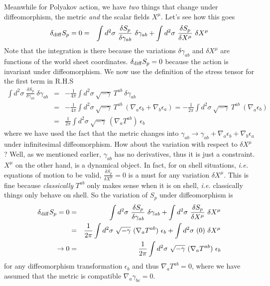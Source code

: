 \documentclass[aps,preprint,preprintnumbers,nofootinbib,showpacs,prd]{revtex4-1}
\newcommand{\ie}{{\it i.e.} }
\newcommand{\nbea}{\begin{eqnarray*}}
\newcommand{\neea}{\end{eqnarray*}}
\begin{document}
Meanwhile for Polyakov action, we have {\it two} things that change under diffeomorphism, the metric {\it and} the scalar fields $X^\mu$. Let's see how this goes
%
\nbea
\delta_{\rm diff} S_p = 0 & = & \int d^2\sigma~\frac{\delta S_p}{\delta \gamma_{ab}} ~\delta \gamma_{ab} + \int d^2\sigma~\frac{\delta S_p}{\delta X^\mu} ~\delta X^\mu
\neea
%
Note that the integration is there because the variations $\delta \gamma_{ab}$ and $\delta X^\mu$ are functions of the world sheet coordinates. $\delta_{\rm diff} S_p = 0$ because the action is invariant under diffeomorphism. We now use the definition of the stress tensor for the first term in R.H.S
%
\nbea
\int d^2\sigma~\frac{\delta S_p}{\delta \gamma_{ab}} ~\delta \gamma_{ab} & = & -\frac{1}{4\pi} \int d^2 \sigma~\sqrt{-\gamma}~T^{ab} ~\delta \gamma_{ab} \\
& = & -\frac{1}{4\pi} \int d^2 \sigma~\sqrt{-\gamma}~T^{ab} ~(\nabla_a \epsilon_b + \nabla_b \epsilon_a) = -\frac{1}{2\pi} \int d^2 \sigma~\sqrt{-\gamma}~T^{ab} ~(\nabla_a \epsilon_b)  \\
& = & \frac{1}{2\pi} \int d^2 \sigma~\sqrt{-\gamma}~(\nabla_aT^{ab}) ~ \epsilon_b
\neea
%
where we have used the fact that the metric changes into $\gamma_{ab} \rightarrow \gamma_{ab} + \nabla_a \epsilon_b + \nabla_b \epsilon_a$ under infinitesimal diffeomorphism. How about the variation with respect to $\delta X^\mu$? Well, as we mentioned earlier, $\gamma_{ab}$ has no derivatives, thus it is just a constraint. $X^\mu$ on the other hand, is a dynamical object. In fact, for on shell situations, \ie equations of motion to be valid, $\frac{\delta S_p}{\delta X^\mu} = 0$ is a must for any variation ${\delta X^\mu}$. This is fine because {\it classically} $T^{ab}$ only makes sense when it is on shell, \ie classically things only behave on shell. So the variation of $S_p$ under diffeomorphism is
%
\nbea
\delta_{\rm diff} S_p = 0 & = & \int d^2\sigma~\frac{\delta S_p}{\delta \gamma_{ab}} ~\delta \gamma_{ab} + \int d^2\sigma~\frac{\delta S_p}{\delta X^\mu} ~\delta X^\mu \\
& = & \frac{1}{2\pi} \int d^2 \sigma~\sqrt{-\gamma}~(\nabla_aT^{ab}) ~ \epsilon_b + \int d^2\sigma~(0) ~\delta X^\mu \\
\rightarrow 0 & = & \frac{1}{2\pi} \int d^2 \sigma~\sqrt{-\gamma}~(\nabla_aT^{ab}) ~ \epsilon_b
\neea
%
for any diffeomorphism transformation $\epsilon_b$ and thus $\nabla_aT^{ab} = 0$, where we have assumed that the metric is compatible $\nabla_a \gamma_{bc} = 0$.
\end{document}
